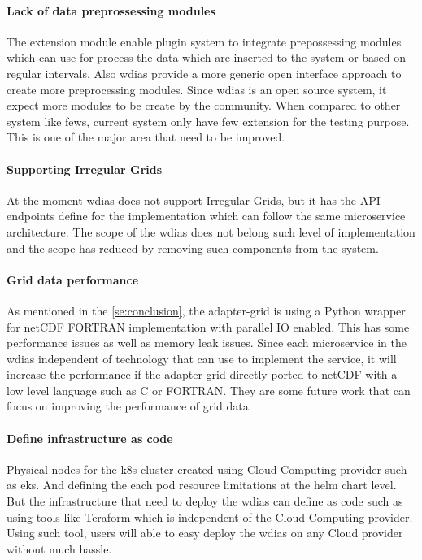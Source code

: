 \documentclass[conference]{IEEEtran}
\begin{document}
\paragraph{Lack of data preprossessing modules}
The extension module enable plugin system to integrate prepossessing modules which can use for process the data which are inserted to the system or based on regular intervals. Also \acrshort{wdias} provide a more generic open interface approach to create more preprocessing modules. Since \acrshort{wdias} is an open source system, it expect more modules to be create by the community. When compared to other system like \acrshort{fews}, current system only have few extension for the testing purpose. This is one of the major area that need to be improved.

\paragraph{Supporting Irregular Grids}
At the moment \acrshort{wdias} does not support Irregular Grids, but it has the API endpoints define for the implementation which can follow the same microservice architecture. The scope of the \acrshort{wdias} does not belong such level of implementation and the scope has reduced by removing such components from the system.

\paragraph{Grid data performance}
As mentioned in the \cref{se:conclusion}, the adapter-grid is using a Python wrapper for netCDF FORTRAN implementation with parallel IO enabled. This has some performance issues as well as memory leak issues. Since each microservice in the \acrshort{wdias} independent of technology that can use to implement the service, it will increase the performance if the adapter-grid directly ported to netCDF with a low level language such as C or FORTRAN. They are some future work that can focus on improving the performance of grid data.

\paragraph{Define infrastructure as code}
Physical nodes for the \acrshort{k8s} cluster created using Cloud Computing provider such as \acrshort{eks}. And defining the each pod resource limitations at the helm chart level. But the infrastructure that need to deploy the \acrshort{wdias} can define as code such as using tools like Teraform which is independent of the Cloud Computing provider. Using such tool, users will able to easy deploy the \acrshort{wdias} on any Cloud provider without much hassle.
\end{document}
